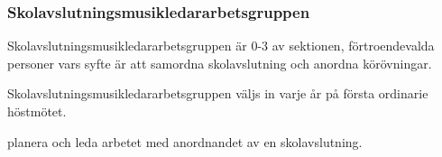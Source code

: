 \subsubsection{Skolavslutningsmusikledararbetsgruppen}
Skolavslutningsmusikledararbetsgruppen är 0-3 av sektionen, förtroendevalda personer vars syfte är att samordna skolavslutning och anordna körövningar.

Skolavslutningsmusikledararbetsgruppen väljs in varje år på första ordinarie höstmötet.

\begin{att}
  \item planera och leda arbetet med anordnandet av en skolavslutning.
\end{att}
